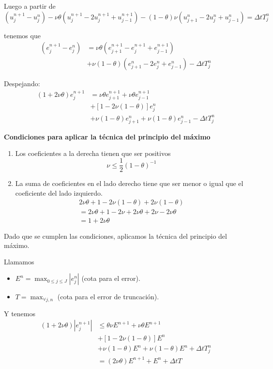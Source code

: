 Luego a partir de
$$(u_j^{n+1}-u_j^n)-\nu\theta(u_{j}^{n+1}-2u_{j}^{n+1}+u_{j-1}^{n+1}) - (1-\theta)\nu(u_{j+1}^{n}-2u_{j}^{n}+u_{j-1}^{n}) = \Delta t T_j^n$$

tenemos que
\begin{align*}
(e_{j}^{n+1}-e_{j}^{n}) & = \nu\theta(e_{j+1}^{n+1}-e_{j}^{n+1}+e_{j-1}^{n+1})\\
& + \nu(1-\theta)(e_{j+1}^{n}-2e_{j}^{n}+e_{j-1}^{n}) - \Delta tT_j^n
\end{align*}

Despejando:
\begin{align*}
	(1+2\nu\theta)e_j^{n+1} & = \nu\theta e_{j+1}^{n+1} + \nu\theta e_{j-1}^{n+1}\\
	& +\left[1 - 2\nu(1-\theta)\right] e_{j}^{n}\\
	& +\nu(1-\theta)e_{j+1}^{n} + \nu (1-\theta)e_{j-1}^{n} - \Delta t T_j^n
\end{align*}

\textbf{Condiciones para aplicar la técnica del principio del máximo}
\begin{enumerate}
	\item Los coeficientes a la derecha tienen que ser positivos
			$$\nu \le \frac{1}{2}(1-\theta)^{-1}$$
	\item La suma de coeficientes en el lado derecho tiene que ser menor o igual que el coeficiente del lado izquierdo.
	\begin{align*}
		2\nu\theta + 1 - 2\nu(1-\theta) + 2\nu(1-\theta)\\
		= 2\nu\theta + 1 - 2\nu + 2\nu\theta + 2\nu -2\nu\theta\\
		= 1+2\nu\theta
	\end{align*}
\end{enumerate}

Dado que se cumplen las condiciones, aplicamos la técnica del principio del máximo. 

Llamamos
\begin{itemize}
	\item $E^n= \max_{0\le j\le J}|e_j^n|$ (cota para el error).
	\item $T = \max_{\forall j, n}$ (cota para el error de truncación).
\end{itemize}

Y tenemos
\begin{align*}
	(1+2\nu\theta)|e_j^{n+1}| & \le \theta\nu E^{n+1} + \nu\theta E^{n+1}\\
	& +\left[1 - 2\nu(1-\theta)\right] E^{n}\\
	& +\nu(1-\theta)E^{n} + \nu (1-\theta)E^{n} + \Delta t T_j^n\\
	& = (2\nu\theta)E^{n+1}+E^n+\Delta t T
\end{align*}


